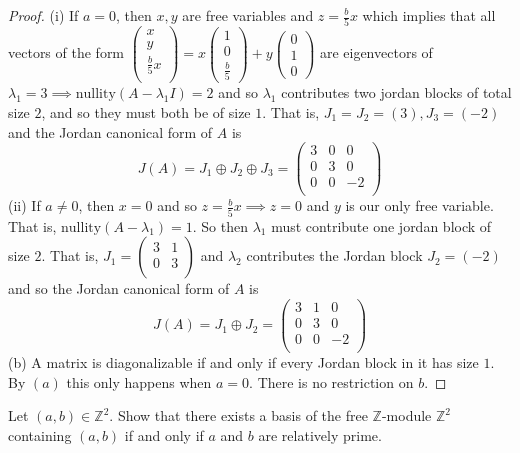 \documentclass[addpoints,10pt]{exam}
\theoremstyle{plain}
\theoremstyle{definition}
\newtheorem{prob}[thm]{Problem}
\theoremstyle{plain}
\theoremstyle{plain}
\theoremstyle{definition}
\let\oldprob\prob
\let\endoldprob\endprob
\renewenvironment{prob}
  {\begin{singlespace}\oldprob}
  {\endoldprob\end{singlespace}}
\begin{document}
\begin{proof}
(i) If $a=0$, then $x,y$ are free variables and $z=\frac{b}{5}x$ which implies that all vectors of the form $\begin{pmatrix}x\\ y \\ \frac{b}{5}x\\ \end{pmatrix}=
x\begin{pmatrix} 1\\0\\\frac{b}{5}\end{pmatrix}+y\begin{pmatrix} 0\\1\\0\end{pmatrix}$ are eigenvectors of $\lambda_{1}=3\implies \mathrm{nullity}(A-\lambda_{1}I)=2$ and so $\lambda_{1}$ contributes two jordan blocks of total size $2$, and so they must both be of size $1$. That is, $J_{1}=J_{2}=(3), J_{3}=(-2)$ and the Jordan canonical form of $A$ is
$$J(A)=J_{1}\oplus J_{2}\oplus J_{3}=\begin{pmatrix} 3&0& 0\\0 & 3 & 0\\0&0&-2\\ \end{pmatrix}$$
(ii) If $a\neq 0$, then $x=0$ and so $z=\frac{b}{5}x\implies z=0$ and $y$ is our only free variable. That is, $\mathrm{nullity}(A-\lambda_{1})=1$. So then $\lambda_{1}$ must contribute one jordan block of size $2$. That is, $J_{1}=\begin{pmatrix} 3& 1\\0 &3 \\\end{pmatrix}$ and $\lambda_{2}$ contributes the Jordan block $J_{2}=(-2)$ and so the Jordan canonical form of $A$ is
$$J(A)=J_{1}\oplus J_{2}=\begin{pmatrix} 3&1& 0\\0 & 3 & 0\\0&0&-2\\ \end{pmatrix}$$
(b) A matrix is diagonalizable if and only if every Jordan block in it has size $1$. By $(a)$ this only happens when $a=0$. There is no restriction on $b$.

\end{proof}
\newpage
\begin{prob}
Let $(a,b)\in \mathbb{Z}^2$. Show that there exists a basis of the free $\mathbb{Z}$-module $\mathbb{Z}^2$ containing $(a,b)$ if and only if $a$ and $b$ are relatively prime.
\end{prob}
\end{document}
